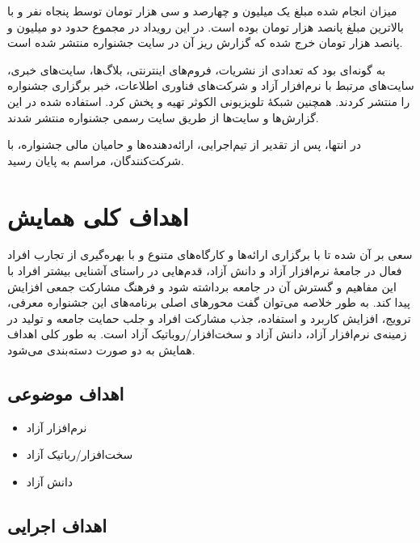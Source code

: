 \documentclass{article}
\begin{document}
میزان  انجام شده مبلغ یک میلیون و چهارصد و سی هزار تومان توسط پنجاه نفر و با بالاترین مبلغ پانصد هزار تومان بوده است. در این رویداد در مجموع حدود دو میلیون و پانصد هزار تومان خرج شده که گزارش ریز آن در سایت جشنواره منتشر شده است.

 به گونه‌ای بود که تعدادی از نشریات، فروم‌های اینترنتی، بلاگ‌ها، سایت‌های خبری، سایت‌های مرتبط با نرم‌افزار آزاد و شرکت‌های فناوری اطلاعات، خبر برگزاری جشنواره را منتشر کردند. همچنین شبکهٔ تلویزیونی الکوثر  تهیه و پخش کرد.  استفاده شده در این گزارش‌ها و سایت‌ها از طریق سایت رسمی جشنواره منتشر شدند.

در انتها، پس از تقدیر از تیم‌اجرایی، ارائه‌دهنده‌ها و حامیان مالی جشنواره، با  شرکت‌کنندگان، مراسم به پایان رسید.

\section{اهداف کلی همایش}
سعی بر آن شده تا با برگزاری ارائه‌ها و کارگاه‌های متنوع و با بهره‌گیری از تجارب افراد فعال در جامعهٔ نرم‌افزار آزاد و دانش آزاد، قدم‌هایی در راستای آشنایی بیشتر افراد با این مفاهیم و گسترش آن در جامعه برداشته شود و فرهنگ مشارکت جمعی افزایش پیدا کند. به طور خلاصه می‌توان گفت محورهای اصلی برنامه‌های این جشنواره معرفی، ترویج، افزایش کاربرد و استفاده، جذب مشارکت افراد و جلب حمایت جامعه و تولید در زمینه‌ی نرم‌افزار آزاد، دانش آزاد و سخت‌افزار/روباتیک آزاد است. به طور کلی اهداف همایش به دو صورت دسته‌بندی می‌شود.

\subsection{اهداف موضوعی}
\begin{flushright}

\begin{itemize}
\item نرم‌افزار آزاد
\item سخت‌افزار/رباتیک آزاد
\item دانش آزاد
\end{itemize}
\end{flushright}

\subsection{اهداف اجرایی}
\end{document}
